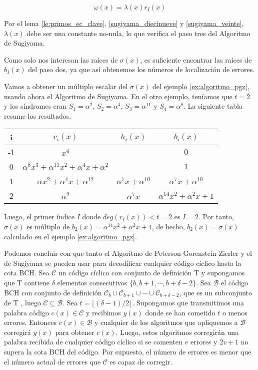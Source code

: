 \begin{equation}
\label{sugiyama_veinte}
\omega(x) = \lambda(x)r_I(x)
\end{equation}

Por el lema \ref{le:primos_ec_clave}, \ref{sugiyama_diecinueve} y \ref{sugiyama_veinte}, $\lambda(x)$ debe ser una constante no-nula, lo que verifica el paso tres del Algoritmo de Sugiyama.

Como solo nos interesan las raíces de $\sigma(x)$, es suficiente encontrar las raíces de $b_I(x)$ del paso dos, ya que así obtenemos los números de localización de errores.

\begin{exampleth}
\label{ex:algoritmo_sugiyama}

Vamos a obtener un múltiplo escalar del $\sigma(x)$ del ejemplo \ref{ex:algoritmo_pgz}, usando ahora el Algoritmo de Sugiyama. En el otro ejemplo, teníamos que $t=2$ y los síndromes eran $S_1 = \alpha^2$, $S_2 = \alpha^4$, $S_3 = \alpha^{11}$ y $S_4 = \alpha^8$. La siguiente tabla resume los resultados.

\begin{tabular}{ c | c | c | c |}
	i & $r_i(x)$ & $h_i(x)$ & $b_i(x)$\\ \hline
	-1 & $x^4$  &  & $0$ \\
	0 & $\alpha^8x^3 + \alpha^{11}x^2+\alpha^4x + \alpha^2$ &  & $1$ \\ 
	1 & $\alpha x^2 + \alpha^4 x + \alpha^{12}$ & $\alpha^7 x + \alpha^{10}$ & $\alpha^7 x + \alpha^{10}$ \\
	2 & $\alpha^2$  &  $\alpha^7 x$ & $\alpha^{14}x^2 + \alpha^2 x + 1$ 
	\end{tabular}

Luego, el primer índice $I$ donde $deg(r_I(x)) < t = 2$ es $I = 2$. Por tanto, $\sigma(x)$ es múltiplo de $b_2(x) = \alpha^{14}x^2 + \alpha^2 x + 1 $, de hecho, $b_2(x) = \sigma(x)$ calculado en el ejemplo \ref{ex:algoritmo_pgz}.
\end{exampleth}

Podemos concluir con que tanto el Algoritmo de Peterson-Gorenstein-Zierler y el de Sugiyama se pueden usar para decodificar cualquier código cíclico hasta la cota BCH. Sea $\mathcal{C}$ un código cíclico con conjunto de definición T y supongamos que T contiene $\delta$ elementos consecutivos $\{ b, b+1, \cdots , b + \delta -2 \}$. Sea $\mathcal{B}$ el código BCH con conjunto de definición $\mathcal{C}_b \cup \mathcal{C}_{b+1} \cup \cdots \cup \mathcal{C}_{b + \delta -2}$, que es un subconjunto de T , luego $\mathcal{C} \subseteq \mathcal{B}$. Sea $t = \lfloor (\delta -1)/2 \rfloor$. Supongamos que transmitimos una palabra código $c(x) \in \mathcal{C}$ y recibimos $y(x)$ donde se han cometido $t$ o menos errores. Entonces $ c(x) \in \mathcal{B}$ y cualquier de los algoritmos que apliquemos a $\mathcal{B}$ corregirá $y(x)$ para obtener $c(x)$. Luego, estos algoritmos corregirán una palabra recibida de cualquier código cíclico si se comenten $v$ errores y $2v+1$ no supera la cota BCH del código. Por supuesto, el número de errores es menor que el número actual de errores que $\mathcal{C}$ es capaz de corregir. 






